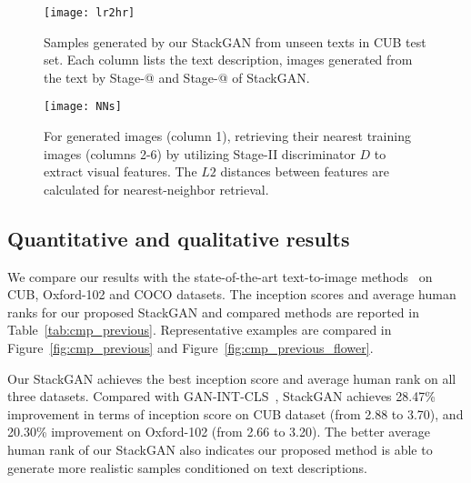\documentclass[10pt,twocolumn,letterpaper]{article}
\makeatletter
\newcommand{\Rmnum}[1]{\expandafter\@slowromancap\romannumeral #1@}
\makeatother
\begin{document}
\begin{figure*}[bt]
\begin{center}
	\texttt{[image: lr2hr]}
\end{center}
\vspace{-8pt}
   \caption{Samples generated by our StackGAN from unseen texts in CUB test set. 
   Each column lists the text description, images generated from the text by Stage-\Rmnum{1} and Stage-\Rmnum{2} of StackGAN.}
\vspace{-10pt}
\label{fig:lr2hr}
\end{figure*}


\begin{figure}[bt]
\begin{center}
	\texttt{[image: NNs]}
\end{center}
\vspace{-8pt}
   \caption{For generated images (column 1), retrieving their nearest training images (columns 2-6) by utilizing Stage-II discriminator $D$ to extract visual features. The $L2$ distances between features are calculated for nearest-neighbor retrieval.}
\vspace{-10pt}
\label{fig:NNs}
\end{figure}


\vspace{-2pt}
\subsection{Quantitative and qualitative results}
\vspace{-5pt}

We compare our results with the state-of-the-art text-to-image methods~\cite{reed2016learning, reed2016generative} on CUB, Oxford-102 and COCO datasets. The inception scores and average human ranks for our proposed StackGAN and compared methods are reported in Table~\ref{tab:cmp_previous}. Representative examples are compared in Figure~\ref{fig:cmp_previous} and Figure~\ref{fig:cmp_previous_flower}.

Our StackGAN achieves the best inception score and average human rank on all three datasets. Compared with GAN-INT-CLS~\cite{reed2016generative}, StackGAN achieves 28.47\% improvement in terms of inception score on CUB dataset (from 2.88 to 3.70), and 20.30\% improvement on Oxford-102 (from 2.66 to 3.20). The better average human rank of our StackGAN also indicates our proposed method is able to generate more realistic samples conditioned on text descriptions.
\end{document}
